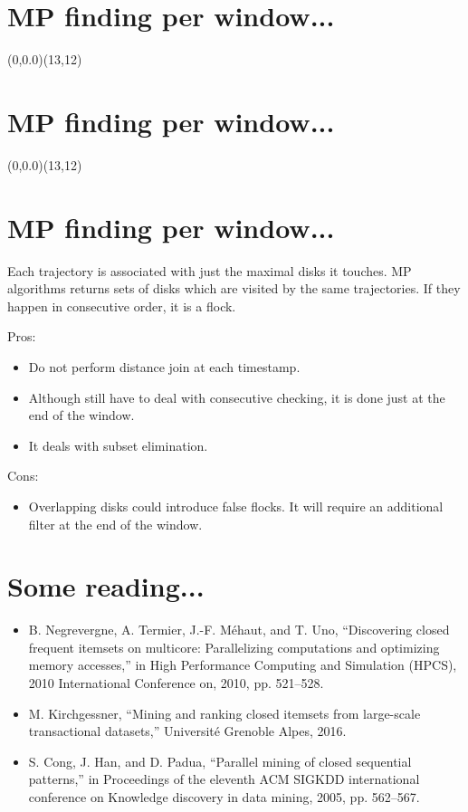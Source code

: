 \section*{MP finding per window...}
	\vspace{1cm}
	 {
	\begin{pspicture}(0,0.0)(13,12)
		
	\end{pspicture}
}
\clearpage
\section*{MP finding per window...}
	\vspace{1cm}
	 {
	\begin{pspicture}(0,0.0)(13,12)
		
		
	\end{pspicture}
}
\clearpage
\section*{MP finding per window...}
	\vspace{1cm}
	Each trajectory is associated with just the maximal disks it touches.  MP algorithms returns sets of disks which are visited by the same trajectories.  If they happen in consecutive order, it is a flock.
	\vspace{0.5cm}
	
	Pros:
	\begin{itemize}
		\item Do not perform distance join at each timestamp.  
		\item Although still have to deal with consecutive checking, it is done just at the end of the window.
		\item It deals with subset elimination.
	\end{itemize}
	Cons:
	\begin{itemize}
		\item Overlapping disks could introduce false flocks.  It will require an additional filter at the end of the window.
	\end{itemize}
\clearpage
\section*{Some reading...}
	\begin{itemize}
		\item B. Negrevergne, A. Termier, J.-F. Méhaut, and T. Uno, “Discovering closed frequent itemsets on multicore: Parallelizing computations and optimizing memory accesses,” in High Performance Computing and Simulation (HPCS), 2010 International Conference on, 2010, pp. 521–528.
		\item M. Kirchgessner, “Mining and ranking closed itemsets from large-scale transactional datasets,” Université Grenoble Alpes, 2016.
		\item S. Cong, J. Han, and D. Padua, “Parallel mining of closed sequential patterns,” in Proceedings of the eleventh ACM SIGKDD international conference on Knowledge discovery in data mining, 2005, pp. 562–567.


	\end{itemize}

\clearpage
	
